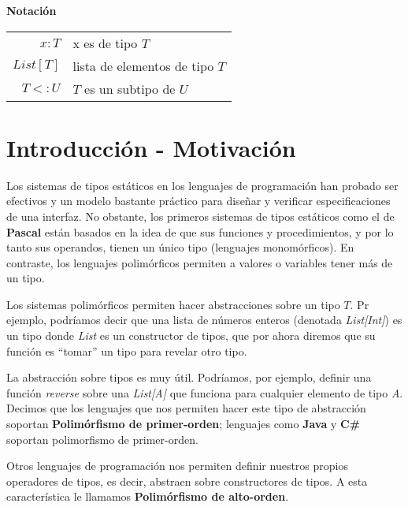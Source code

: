 \documentclass[spanish,11pt]{article}
\begin{document}
\maketitle

\begin{abstract}
\end{abstract}

\begin{center}
\textbf{Notación}
\end{center}
\begin{center}
  \begin{tabular}{r|l}
    $x:T$ & x es de tipo $T$ \\
    $List[T]$ & lista de elementos de tipo $T$ \\
    $T <: U$ & $T$ es un subtipo de $U$ \\
  \end{tabular}
\end{center}


\section{Introducción - Motivación}

Los sistemas de tipos estáticos en los lenguajes de programación han probado ser efectivos y un modelo bastante práctico para diseñar y verificar especificaciones de una interfaz. No obstante, los primeros sistemas de tipos estáticos como el de \textbf{Pascal} están basados en la idea de que sus funciones y procedimientos, y por lo tanto sus operandos, tienen un único tipo (lenguajes monomórficos). En contraste, los lenguajes polimórficos permiten a valores o variables tener más de un tipo. 

Los sistemas polimórficos permiten hacer abstracciones sobre un tipo $T$. Pr ejemplo, podríamos decir que una lista de números enteros (denotada \textit{List[Int]}) es un tipo donde \textit{List} es un constructor de tipos, que por ahora diremos que su función es ``tomar'' un tipo para revelar otro tipo.  

La abstracción sobre tipos es muy útil. Podríamos, por ejemplo, definir una función \textit{reverse} sobre una \textit{List[A]} que funciona para cualquier elemento de tipo \textit{A}. Decimos que los lenguajes que nos permiten hacer este tipo de abstracción soportan \textbf{Polimórfismo de primer-orden}; lenguajes como \textbf{Java} y \textbf{C\#} soportan polimorfismo de primer-orden.

Otros lenguajes de programación nos permiten definir nuestros propios operadores de tipos, es decir, abstraen sobre constructores de tipos. A esta característica le llamamos \textbf{Polimórfismo de alto-orden}.
\end{document}
